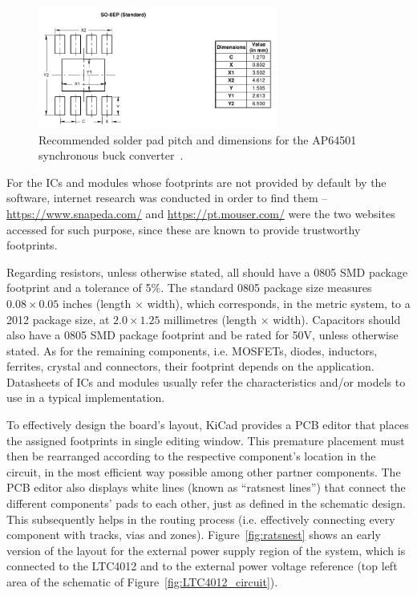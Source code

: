 \begin{figure}[h]
	\centering
	\includegraphics[width=0.7\textwidth]{Chapters/Figures/chapter5/footprint_AP64501.pdf}
	\caption{Recommended solder pad pitch and dimensions for the AP64501 synchronous buck converter~\cite{AP64501}.}
	\label{fig:footprint_AP64501}
\end{figure}

For the ICs and modules whose footprints are not provided by default by the software, internet research was conducted in order to find them -- \url{https://www.snapeda.com/} and \url{https://pt.mouser.com/} were the two websites accessed for such purpose, since these are known to provide trustworthy footprints.

Regarding resistors, unless otherwise stated, all should have a 0805 \gls{SMD} package footprint and a tolerance of 5\%. The standard 0805 package size measures $0.08 \times 0.05$ inches (length $\times$ width), which corresponds, in the metric system, to a 2012 package size, at $2.0 \times 1.25$ millimetres (length $\times$ width).
Capacitors should also have a 0805 SMD package footprint and be rated for 50V, unless otherwise stated.
As for the remaining components, i.e. MOSFETs, diodes, inductors, ferrites, crystal and connectors, their footprint depends on the application.
Datasheets of ICs and modules usually refer the characteristics and/or models to use in a typical implementation.

To effectively design the board's layout, KiCad provides a PCB editor that places the assigned footprints in single editing window. This premature placement must then be rearranged according to the respective component's location in the circuit, in the most efficient way possible among other partner components. The PCB editor also displays white lines (known as ``ratsnest lines'') that connect the different components' pads to each other, just as defined in the schematic design. This subsequently helps in the routing process (i.e. effectively connecting every component with tracks, vias and zones). Figure~\ref{fig:ratsnest} shows an early version of the layout for the external power supply region of the system, which is connected to the LTC4012 and to the external power voltage reference (top left area of the schematic of Figure~\ref{fig:LTC4012_circuit}).

